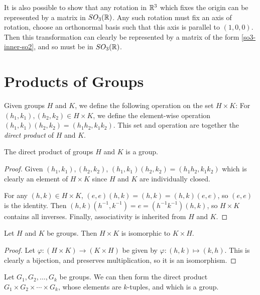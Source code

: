 It is also possible to show that any rotation in $\mathbb{R}^3$ which fixes the origin can be represented by a matrix in $SO_3(\mathbb{R})$. Any such rotation must fix an axis of rotation, choose an orthonormal basis such that this axis is parallel to $(1, 0, 0)$. Then this transformation can clearly be represented by a matrix of the form \ref{so3-inner-so2}, and so must be in $SO_3(\mathbb{R})$.

\section{Products of Groups}

\begin{defn}
    Given groups $H$ and $K$, we define the following operation on the set $H \times K$: For $(h_1, k_1), (h_2, k_2) \in H \times K$, we define the element-wise operation $(h_1, k_1)(h_2, k_2) = (h_1h_2, k_1k_2)$. This set and operation are together the \emph{direct product} of $H$ and $K$.
\end{defn}

\begin{prop}
    The direct product of groups $H$ and $K$ is a group.
\end{prop}

\begin{proof}
    Given $(h_1, k_1), (h_2, k_2)$, $(h_1, k_1)(h_2, k_2) = (h_1h_2, k_1k_2)$ which is clearly an element of $H \times K$ since $H$ and $K$ are individually closed.

    For any $(h, k) \in H \times K$, $(e, e)(h,k) = (h, k) = (h, k)(e, e)$, so $(e, e)$ is the identity. Then $(h, k)(h^{-1}, k^{-1}) = e = (h^{-1}k^{-1})(h, k)$, so $H \times K$ contains all inverses. Finally, associativity is inherited from $H$ and $K$.
\end{proof}

\begin{prop}
    Let $H$ and $K$ be groups. Then $H \times K$ is isomorphic to $K \times H$.
\end{prop}

\begin{proof}
    Let $\varphi: (H \times K) \to (K \times H)$ be given by $\varphi: (h, k) \mapsto (k, h)$. This is clearly a bijection, and preserves multiplication, so it is an isomorphism.
\end{proof}

\begin{prop}
    Let $G_1, G_2, \ldots, G_k$ be groups. We can then form the direct product $G_1 \times G_2 \times \cdots \times G_k$, whose elements are $k$-tuples, and which is a group.
\end{prop}

